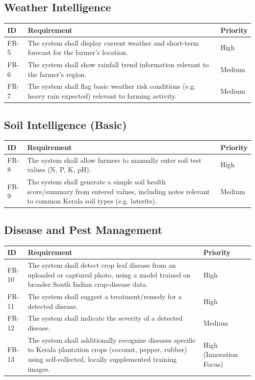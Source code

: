 \documentclass[12pt,a4paper]{article}
\begin{document}
\subsection{Weather Intelligence}
\begin{longtable}{p{1.4cm} p{9cm} p{2.3cm}}
\toprule
\textbf{ID} & \textbf{Requirement} & \textbf{Priority} \\
\midrule
\endhead
FR-5 & The system shall display current weather and short-term forecast for the farmer's location. & High \\
FR-6 & The system shall show rainfall trend information relevant to the farmer's region. & Medium \\
FR-7 & The system shall flag basic weather risk conditions (e.g. heavy rain expected) relevant to farming activity. & Medium \\
\bottomrule
\end{longtable}

\subsection{Soil Intelligence (Basic)}
\begin{longtable}{p{1.4cm} p{9cm} p{2.3cm}}
\toprule
\textbf{ID} & \textbf{Requirement} & \textbf{Priority} \\
\midrule
\endhead
FR-8 & The system shall allow farmers to manually enter soil test values (N, P, K, pH). & High \\
FR-9 & The system shall generate a simple soil health score/summary from entered values, including notes relevant to common Kerala soil types (e.g. laterite). & Medium \\
\bottomrule
\end{longtable}

\subsection{Disease and Pest Management}
\begin{longtable}{p{1.4cm} p{9cm} p{2.3cm}}
\toprule
\textbf{ID} & \textbf{Requirement} & \textbf{Priority} \\
\midrule
\endhead
FR-10 & The system shall detect crop leaf disease from an uploaded or captured photo, using a model trained on broader South Indian crop-disease data. & High \\
FR-11 & The system shall suggest a treatment/remedy for a detected disease. & High \\
FR-12 & The system shall indicate the severity of a detected disease. & Medium \\
FR-13 & The system shall additionally recognize diseases specific to Kerala plantation crops (coconut, pepper, rubber) using self-collected, locally supplemented training images. & High (Innovation Focus) \\
\bottomrule
\end{longtable}
\end{document}
